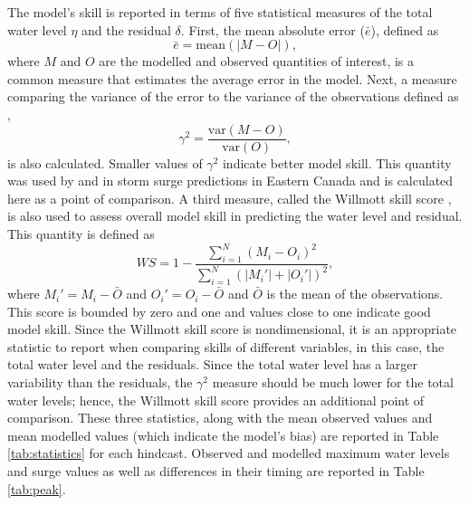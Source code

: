 \documentclass[letterpaper]{tATO2e}
\begin{document}
The model's skill is reported in terms of five statistical measures of the total water level $\eta$ and the residual $\delta$. First, the mean absolute error ($\bar{e}$), defined as
\begin{equation}
\bar{e} = \text{mean}\left(\left| M - O \right|\right),
\end{equation}
where $M$ and $O$ are the modelled and observed quantities of interest, is a common measure that estimates the average error in the model. Next, a measure comparing the variance of the error to the variance of the observations defined as \citep{thompson2003prediction},
\begin{equation}
\gamma^2 = \frac{\text{var}\left(M-O\right)}{\text{var}\left(O\right)},
\end{equation}
is also calculated. Smaller values of $\gamma^2$ indicate better model skill. This quantity was used by \citet{bernier2006predicting} and \citet{bernier2010tide} in storm surge predictions in Eastern Canada and is calculated here as a point of comparison. A third measure, called the Willmott skill score \citep{willmott1982some}, is also used to assess overall model skill in predicting the water level and residual. This quantity is defined as
\begin{equation}
WS = 1 - \frac{\sum_{i=1}^N \left(M_i - O_i\right)^2}{\sum_{i=1}^N \left(|M_i'| + |O_i'|\right)^2},
\end{equation} 
where $M_i' = M_i-\bar{O}$ and $O_i'=O_i-\bar{O}$ and $\bar{O}$ is the mean of the observations. This score is bounded by zero and one and values close to one indicate good model skill. Since the Willmott skill score is nondimensional, it is an appropriate statistic to report when comparing skills of different variables, in this case, the total water level and the residuals. Since the total water level has a larger variability than the residuals, the $\gamma^2$ measure should be much lower for the total water levels; hence, the Willmott skill score provides an additional point of comparison. These three statistics, along with the mean observed values and mean modelled values (which indicate the model's bias) are reported in Table \ref{tab:statistics} for each hindcast.  {\color{red} Observed and modelled maximum water levels and surge values as well as differences in their timing are reported in Table \ref{tab:peak}.}
\end{document}
